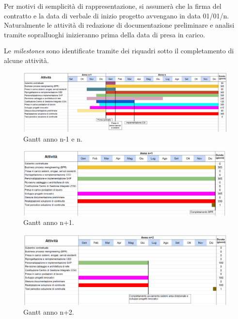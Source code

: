            
            Per motivi di semplicità di rappresentazione, si assumerà che la firma del contratto e la data di verbale di inizio progetto avvengano in data 01/01/n. Naturalmente le attività di redazione di documentazione preliminare e analisi tramite sopralluoghi inizieranno prima della data di presa in carico.
            
            
            Le \textit{milestones} sono identificate tramite dei riquadri sotto il completamento di alcune attività. 
            
            
            \begin{figure}[H]
				\centering
				\includegraphics[width=\textwidth]{immagini/rollout/gantt-a1}
				\caption{Gantt anno n-1 e n.}
			\end{figure}
            
            \begin{figure}[H]
				\centering
				\includegraphics[width=\textwidth]{immagini/rollout/gantt-a2}
				\caption{Gantt anno n+1.}
			\end{figure}
            
            \begin{figure}[H]
				\centering
				\includegraphics[width=\textwidth]{immagini/rollout/gantt-a3}
				\caption{Gantt anno n+2.}
			\end{figure}
                    
